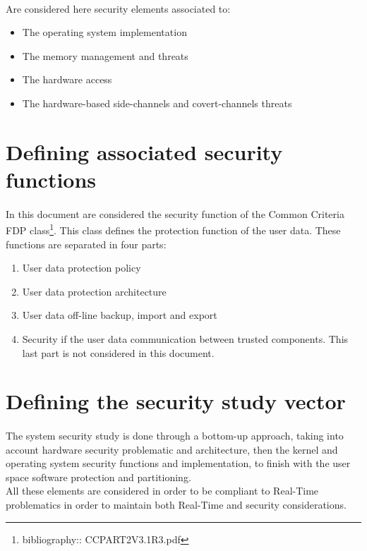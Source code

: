 \paragraph{}
Are considered here security elements associated to:
\begin{itemize}
\item The operating system implementation
\item The memory management and threats
\item The hardware access
\item The hardware-based side-channels and covert-channels threats
\end{itemize}

\section{Defining associated security functions}
\label{sec:cc_fdp}

\paragraph{}
In this document are considered the security function of the Common Criteria FDP
class\footnote{bibliography:\FIXME: CCPART2V3.1R3.pdf}. This class defines the protection function
of the user data. These functions are separated in four parts:
\begin{enumerate}
\item User data protection policy
\item User data protection architecture
\item User data off-line backup, import and export
\item Security if the user data communication between trusted components. This last part is not
considered in this document.
\end{enumerate}

\section{Defining the security study vector}

\paragraph{}
The system security study is done through a bottom-up approach, taking into account hardware
security problematic and architecture, then the kernel and operating system security functions and
implementation, to finish with the user space software protection and partitioning.\\
All these elements are considered in order to be compliant to Real-Time problematics in order to
maintain both Real-Time and security considerations.
